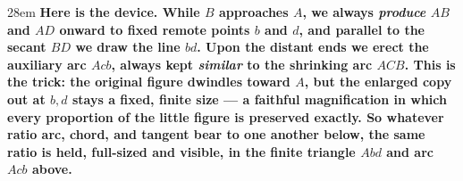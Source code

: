 \documentclass[border=4pt]{standalone}
\begin{document}
\begin{varwidth}{28em}
\large\bfseries
Here is the device. While $B$ approaches $A$, we always \emph{produce} $AB$ and $AD$ onward to      fixed remote points $b$ and $d$, and parallel to the secant $BD$ we draw \textcolor{auxpurple}{the line $bd$}.      Upon the distant ends we erect \textcolor{auxpurple}{the auxiliary arc $Acb$}, always kept \emph{similar} to      the shrinking arc $ACB$. This is the trick: the original figure dwindles toward $A$, but the      enlarged copy out at $b,d$ stays a fixed, finite size --- a faithful magnification in which every      proportion of the little figure is preserved exactly. So whatever ratio arc, chord, and tangent      bear to one another below, the same ratio is held, full-sized and visible, in \textcolor{auxpurple}{the      finite triangle $Abd$ and arc $Acb$} above.
\end{varwidth}
\end{document}
